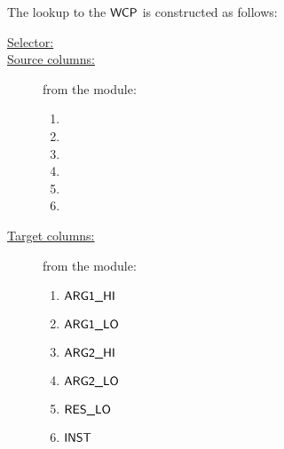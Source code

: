 The lookup to the $\textsf{WCP}$ is constructed as follows:
\begin{description}
	\item[\underline{Selector:}] \ppWcpFlag{}
	\item[\underline{Source columns:}] from the \expMod{} module:
	      \begin{multicols}{3}
		      \begin{enumerate}
			      \item \ppWcpArgOneHi{}
			      \item \ppWcpArgOneLo{}
			      \item \ppWcpArgTwoHi{}
			      \item \ppWcpArgTwoLo{}
			      \item \ppWcpRes{}
			      \item \ppWcpInst{}
		      \end{enumerate}
	      \end{multicols}
	\item[\underline{Target columns:}] from the \wcpMod{} module:
	      \begin{multicols}{3}
		      \begin{enumerate}
			      \item $\textsf{ARG}\textsf{1}\textsf{\_HI}$
			      \item $\textsf{ARG}\textsf{1}\textsf{\_LO}$
			      \item $\textsf{ARG}\textsf{2}\textsf{\_HI}$
			      \item $\textsf{ARG}\textsf{2}\textsf{\_LO}$
			      \item $\textsf{RES}\textsf{\_LO}$
			      \item $\textsf{INST}$
		      \end{enumerate}
	      \end{multicols}
\end{description}
